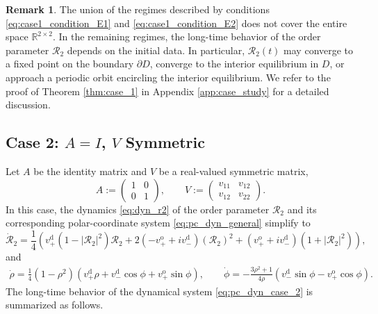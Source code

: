 \documentclass[10pt]{article}
\theoremstyle{definition}
\theoremstyle{definition}
\newtheorem{remark}[theorem]{Remark}
\numberwithin{equation}{section}
\newcommand{\R}{\mathbb{R}}
\newcommand{\CR}{\mathcal{R}}
\newcommand{\vDPlus}{v_+^{\text{d}}}
\newcommand{\vDMinus}{v_-^{\text{d}}}
\newcommand{\vOPlus}{v_+^{\text{o}}}
\newcommand{\Drho}{\Dot{\rho}}
\begin{document}
\begin{remark}
The union of the regimes described by conditions \eqref{eq:case1_condition_E1} and \eqref{eq:case1_condition_E2} does not cover the entire space $\R^{2\times 2}$.
In the remaining regimes, the long-time behavior of the order parameter $\CR_2$ depends on the initial data.
In particular, $\CR_2(t)$ may converge to a fixed point on the boundary $\partial D$, converge to the interior equilibrium in $D$, or approach a periodic orbit encircling the interior equilibrium. We refer to the proof of Theorem \ref{thm:case_1} in Appendix \ref{app:case_study} for a detailed discussion.
\end{remark}

\subsection{Case 2: \texorpdfstring{$A = I$, $V$}{AV} Symmetric}
\label{sec:th_case2}

Let $A$ be the identity matrix and $V$ be a real-valued symmetric matrix,
\begin{equation}
    \label{eq:matrices_A_V_case_2}
    A := \left(\begin{array}{ll}
        1 & 0 \\
        0 & 1
    \end{array} \right),
    \qquad
    V := \left( \begin{array}{ll}
        v_{11} & v_{12}  \\
        v_{12} & v_{22} 
    \end{array} \right) .
\end{equation}
In this case, the dynamics \eqref{eq:dyn_r2} of the order parameter $\CR_2$ and its corresponding polar-coordinate system \eqref{eq:pc_dyn_general} simplify to
\begin{equation}
\Dot{\CR}_2 = \frac{1}{4} \left( \vDPlus \left( 1 - |\CR_2|^2 \right) \CR_2 + 2\left( -\vOPlus + i \vDMinus \right) (\CR_2)^2 + \left( \vOPlus + i\vDMinus \right) \left(1 + |\CR_2|^2 \right) \right),
\end{equation}
and
\begin{equation}
    \label{eq:pc_dyn_case_2}
\begin{split}
    \Drho = \frac{1}{4} (1-\rho^2) \left(\vDPlus \rho + \vDMinus \cos \phi + \vOPlus \sin \phi \right), \qquad 
    \Dot{\phi} = - \frac{3\rho^2 + 1}{4\rho} \left( \vDMinus \sin \phi - \vOPlus \cos \phi \right).
\end{split}
\end{equation}
The long-time behavior of the dynamical system \eqref{eq:pc_dyn_case_2} is summarized as follows.
\end{document}
